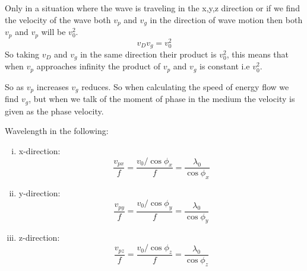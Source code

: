 Only in a situation where the wave is traveling in the x,y,z direction or if we find the velocity of the wave both $v_p$ and $v_g$ in the direction of wave motion then both $v_p$ and $v_p$ will be $v_{0}^2$.
\begin{equation}
v_D v_g = v_{0}^2
\end{equation}
So taking $v_D$ and $v_g$ in the same direction their product is $v_{0}^2$, this means that when $v_p$ approaches infinity the product of $v_p$ and $v_g$ is constant i.e $v_{0}^2$.

So as $v_p$ increases $v_g$ reduces. So when calculating the speed of energy flow we find $v_g$, but when we talk of the moment of phase in the medium the velocity is given as the phase velocity.

Wavelength in the following:
\begin{enumerate}[(i)]
\item x-direction: 
\begin{dmath*}	
\frac{v_{px}}{f} = \frac{v_0/\cos\phi_{x}}{f}
= \frac{\lambda_0}{\cos\phi_{x}}
\end{dmath*}
\item y-direction: 	
\begin{dmath*}
\frac{v_{py}}{f} = \frac{v_0/\cos\phi_{y}}{f}
= \frac{\lambda_0}{\cos\phi_{y}}
\end{dmath*}
\item z-direction: 	
\begin{dmath*}
\frac{v_{pz}}{f} = \frac{v_0/\cos\phi_{z}}{f}
= \frac{\lambda_0}{\cos\phi_{z}}
\end{dmath*}
\end{enumerate}